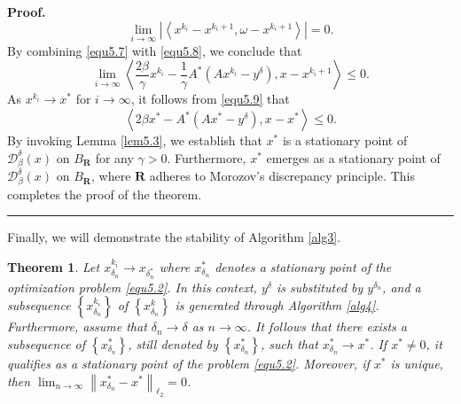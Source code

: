 \documentclass[a4paper,12pt]{article}
\newtheorem{theorem}{Theorem}[section]
\numberwithin{equation}{section}
\newenvironment{proof}[1][Proof]{\textbf{#1.} }
{\ \rule{0.75em}{0.75em}\smallskip}
\begin{document}
\begin{proof}
    \begin{equation}\label{equ5.8}
        \lim_{i\rightarrow\infty}\left|\left<x^{k_{i}}-x^{k_{i}+1}, \omega-x^{k_{i}+1}\right>\right|=0.
    \end{equation}
    By combining \eqref{equ5.7} with \eqref{equ5.8}, we conclude that
    \begin{equation}\label{equ5.9}
        \lim_{i\rightarrow\infty}\left<\frac{2\beta}{\gamma}x^{k_{i}}- \frac{1}{\gamma} A^{*}\left(Ax^{k_{i}} -y^{\delta}\right),x-x^{k_{i}+1}\right>\leq 0.
    \end{equation}
    As $x^{k_{i}}\rightarrow x^{*}$ for $i\rightarrow\infty$, it follows from \eqref{equ5.9} that 
    \begin{equation*}
        \left<2\beta x^{*}- A^{*}\left(Ax^{*} -y^{\delta}\right),x-x^{*}\right>\leq 0.
    \end{equation*}
    By invoking Lemma \ref{lem5.3}, we establish that $x^{*}$ is a stationary point of $\mathcal{D}_{\beta}^{\delta}\left(x\right)$ on $B_{\mathbf{R}}$ for any $\gamma>0$. Furthermore, $x^{*}$ emerges as a stationary point of $\mathcal{D}_{\beta}^{\delta}\left(x\right)$ on $B_{\mathbf{R}}$, where $\mathbf{R}$ adheres to Morozov’s discrepancy principle. This completes the proof of the theorem.
\end{proof}

\par Finally, we will demonstrate the stability of Algorithm \ref{alg3}.

\begin{theorem}\label{the5.9}
    Let $x_{\delta_{n}}^{k_{i}}\rightarrow x_{\delta_{n}^{*}}$ where $x_{\delta_{n}}^{*}$ denotes a stationary point of the optimization problem \eqref{equ5.2}. In this context, $y^{\delta}$ is substituted by  $y^{\delta_{n}}$, and a subsequence $\left\{x_{\delta_{n}}^{k_{i}}\right\}$ of $\left\{x_{\delta_{n}}^{k}\right\}$ is generated through Algorithm \ref{alg4}. Furthermore, assume that $\delta_{n}\rightarrow\delta$ as $n\rightarrow\infty$. It follows that there exists a subsequence of $\left\{x_{\delta_{n}}^{*}\right\}$, still denoted by $\left\{x_{\delta_{n}}^{*}\right\}$, such that $x_{\delta_{n}}^{*}\rightarrow x^{*}$. If $x^{*}\neq 0$, it qualifies as a stationary point of the problem \eqref{equ5.2}. Moreover, if $x^{*}$ is unique, then $\lim_{n\rightarrow\infty}\left\|x_{\delta_{n}}^{*}-x^{*}\right\|_{\ell_{2}}=0$.
\end{theorem}
\end{document}
